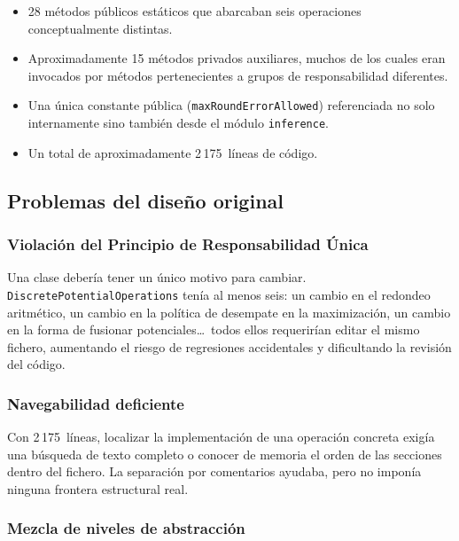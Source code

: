 \documentclass[11pt,a4paper]{article}
\newcommand{\code}[1]{\texttt{#1}}
\begin{document}
\begin{itemize}
  \item 28 m\'etodos p\'ublicos est\'aticos que abarcaban seis operaciones
        conceptualmente distintas.
  \item Aproximadamente 15 m\'etodos privados auxiliares, muchos de los cuales
        eran invocados por m\'etodos pertenecientes a grupos de responsabilidad
        diferentes.
  \item Una \'unica constante p\'ublica (\code{maxRoundErrorAllowed}) referenciada
        no solo internamente sino tambi\'en desde el m\'odulo \code{inference}.
  \item Un total de aproximadamente 2\,175~l\'ineas de c\'odigo.
\end{itemize}

\subsection{Problemas del dise\~no original}

\subsubsection*{Violaci\'on del Principio de Responsabilidad \'Unica}

Una clase deber\'ia tener un \'unico motivo para cambiar.
\code{DiscretePotentialOperations} ten\'ia al menos seis: un cambio en el
redondeo aritm\'etico, un cambio en la pol\'itica de desempate en la maximizaci\'on,
un cambio en la forma de fusionar potenciales\ldots\ todos ellos requerir\'ian editar
el mismo fichero, aumentando el riesgo de regresiones accidentales y dificultando
la revisi\'on del c\'odigo.

\subsubsection*{Navegabilidad deficiente}

Con 2\,175~l\'ineas, localizar la implementaci\'on de una operaci\'on concreta
exig\'ia una b\'usqueda de texto completo o conocer de memoria el orden de las
secciones dentro del fichero.  La separaci\'on por comentarios ayudaba, pero no
impon\'ia ninguna frontera estructural real.

\subsubsection*{Mezcla de niveles de abstracci\'on}
\end{document}
